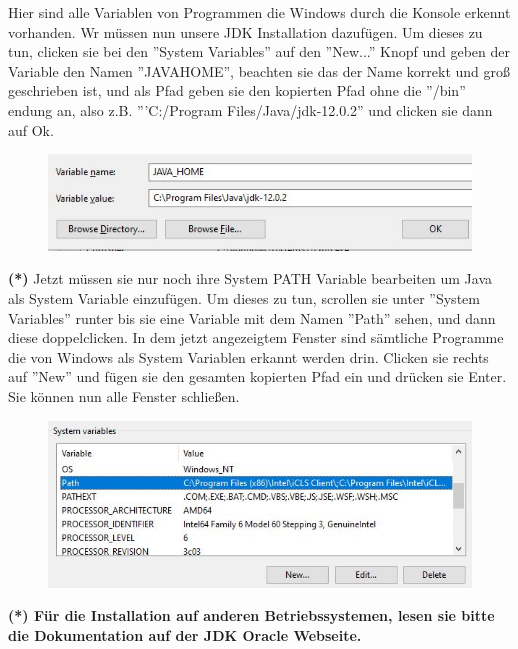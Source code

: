 \documentclass[fontsize=12pt,paper=a4,twoside]{scrartcl}
\begin{document}
Hier sind alle Variablen von Programmen die Windows durch die Konsole erkennt vorhanden. Wr müssen nun unsere JDK Installation dazufügen. Um dieses zu tun, clicken sie bei den ''System Variables'' auf den ''New...'' Knopf und geben der Variable den Namen ''JAVA\textunderscore HOME'', beachten sie das der Name korrekt und groß geschrieben ist, und als Pfad geben sie den kopierten Pfad ohne die ''/bin'' endung an, also z.B. '''C:/Program Files/Java/jdk-12.0.2'' und clicken sie dann auf Ok.
\begin{figure}[h!]
\centering
\includegraphics[width=\linewidth]{JAVA_HOME.JPG}
\end{figure} 

\textbf{(*)}
Jetzt müssen sie nur noch ihre System PATH Variable bearbeiten um Java als System Variable einzufügen. Um dieses zu tun, scrollen sie unter ''System Variables'' runter bis sie eine Variable mit dem Namen ''Path'' sehen, und dann diese doppelclicken. In dem jetzt angezeigtem Fenster sind sämtliche Programme die von Windows als System Variablen erkannt werden drin. Clicken sie rechts auf ''New'' und fügen sie den gesamten kopierten Pfad ein und drücken sie Enter. Sie können nun alle Fenster schließen. 
\begin{figure}[h!]
\centering
\includegraphics[width=\linewidth]{SystemVariables.JPG}
\end{figure} 

\textbf{(*) Für die Installation auf anderen Betriebssystemen, lesen sie bitte die Dokumentation auf der JDK Oracle Webseite.}


\end{document}
